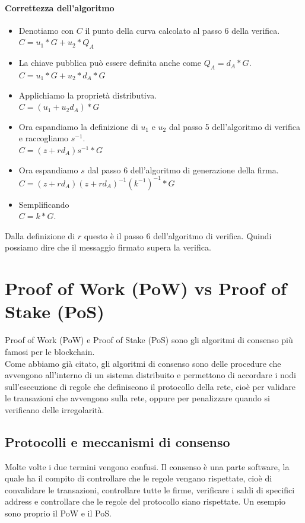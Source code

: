 \documentclass[a4paper,11pt]{report}
\begin{document}
\subsubsection{Correttezza dell'algoritmo}
\begin{itemize}
\item Denotiamo con $C$ il punto della curva calcolato al passo 6 della verifica.\\
$C=u_{1}*G+u_{2}*Q_{A}$
\item La chiave pubblica può essere definita anche come $Q_{A}=d_{A}*G$.\\
$C=u_{1}*G+u_{2}*d_{A}*G$
\item Applichiamo la proprietà distributiva.\\
$C=(u_{1}+u_{2}d_{A})*G$
\item Ora espandiamo la definizione di $u_{1}$ e $u_{2}$ dal passo 5 dell'algoritmo di verifica e raccogliamo $s^{-1}$.\\
$C=(z+rd_{A})s^{-1}*G$
\item Ora espandiamo $s$ dal passo 6 dell'algoritmo di generazione della firma.\\
$C=(z+rd_{A})(z+rd_{A})^{-1}(k^{-1})^{-1}*G$
\item Semplificando\\
$C=k*G$.
\end{itemize}
Dalla definizione di $r$ questo è il passo 6 dell'algoritmo di verifica.
Quindi possiamo dire che il messaggio firmato supera la verifica.


\chapter{Proof of Work (PoW) vs Proof of Stake (PoS)}
Proof of Work (PoW) e Proof of Stake (PoS) sono gli algoritmi di consenso più famosi per le blockchain.\\
Come abbiamo già citato, gli algoritmi di consenso sono delle procedure che avvengono all'interno di un sistema distribuito e permettono di accordare i nodi sull'esecuzione di regole che definiscono il protocollo della rete, cioè per validare le transazioni che avvengono sulla rete, oppure per penalizzare quando si verificano delle irregolarità.

\section{Protocolli e meccanismi di consenso}
Molte volte i due termini vengono confusi. Il consenso è una parte software, la quale ha il compito di controllare che le regole vengano rispettate, cioè di convalidare le transazioni, controllare tutte le firme, verificare i saldi di specifici address e controllare che le regole del protocollo siano rispettate. Un esempio sono proprio il PoW e il PoS.
\end{document}

